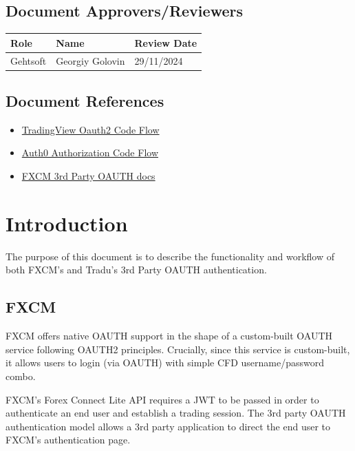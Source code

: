 \documentclass[11pt]{article}
\begin{document}
 

 
\subsection{Document Approvers/Reviewers}
 
\begin{tabular}{p{}p{}p{}} \toprule
\textbf{Role}&\textbf{Name}& \textbf{Review Date} \\ \midrule
Gehtsoft  & Georgiy Golovin & 29/11/2024\\
\bottomrule
\end{tabular}		

 
\subsection{Document References}

\begin{itemize}
    \item \href{https://www.tradingview.com/broker-api-docs/trading/authentication/#oauth2-code-flow}{TradingView Oauth2 Code Flow}
    \item \href{https://auth0.com/docs/get-started/authentication-and-authorization-flow/authorization-code-flow}{Auth0 Authorization Code Flow}
    \item \href{https://github.com/fxcm/3rd-party-oauth}{FXCM 3rd Party OAUTH docs}
\end{itemize}

\newpage

\section{Introduction}
The purpose of this document is to describe the functionality and workflow of both FXCM's and Tradu's 3rd Party OAUTH authentication. 

\subsection{FXCM}

FXCM offers native OAUTH support in the shape of a custom-built OAUTH service following OAUTH2 principles. Crucially, since this service is custom-built, it allows users to login (via OAUTH) with simple CFD username/password combo.

FXCM’s Forex Connect Lite API requires a JWT to be passed in order to authenticate an end user and establish a trading session.  The 3rd party OAUTH authentication model allows a 3rd party application to direct the end user to FXCM’s authentication page.  
\end{document}

